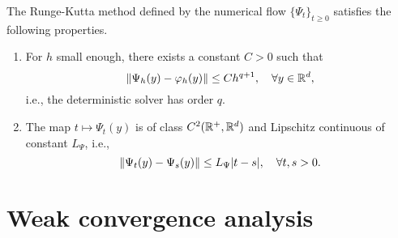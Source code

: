 \documentclass[10pt]{article}
\begin{document}
\begin{assumption}\label{as:PsiStrong} The Runge-Kutta method defined by the numerical flow $\{\Psi_t\}_{t\geq 0}$ satisfies the following properties.
	\begin{enumerate}
		\item\label{as:PsiStrong_Order} For $h$ small enough, there exists a constant $C > 0$ such that
		\begin{equation}
		\lVert\Psi_h(y) - \varphi_h(y)\rVert \leq Ch^{q+1}, \quad \forall y \in \mathbb{R}^d,
		\end{equation}
		i.e., the deterministic solver has order $q$.
		\item\label{as:PsiStrong_Time} The map $t \mapsto \Psi_t(y)$ is of class $C^2(\mathbb{R}^+, \mathbb{R}^d)$ and Lipschitz continuous of constant $L_\Psi$, i.e.,
		\begin{equation}\label{eq:LipschitzPsiT}
		\lVert\Psi_t(y) - \Psi_s(y)\rVert \leq L_\Psi \lvert t - s\rvert, \quad \forall t, s > 0.
		\end{equation}
	\end{enumerate}
\end{assumption}


\section{Weak convergence analysis}\label{sec:WeakOrder}
\end{document}
